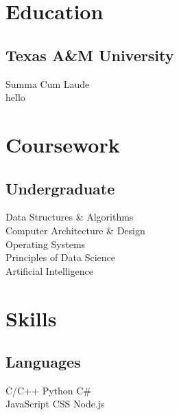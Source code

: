 \documentclass[]{resume-openfont}
\begin{document}
\begin{minipage}[t]{1\textwidth} 
\end{minipage}

\vspace{2.5 mm}

\begin{minipage}[t]{1\textwidth} 
\begin{multicols}{3}
    \section{\Large Education} 
    \subsection{Texas A\&M University}
    Summa Cum Laude \\
    hello
    \sectionsep

    \vfill\null
    \columnbreak

    \section{\Large Coursework}
    \subsection{Undergraduate}
    Data Structures \& Algorithms \\
    Computer Architecture \& Design \\
    Operating Systems \\
    Principles of Data Science \\
    Artificial Intelligence \\
    \sectionsep

    \vfill\null
    \columnbreak

    \section{\Large Skills}
    \subsection{Languages}
    C/C++ \textbullet{} Python \textbullet{} C\# \\
    JavaScript \textbullet{} CSS \textbullet{} Node.js \\

\end{multicols}
\end{minipage}
\end{document}
